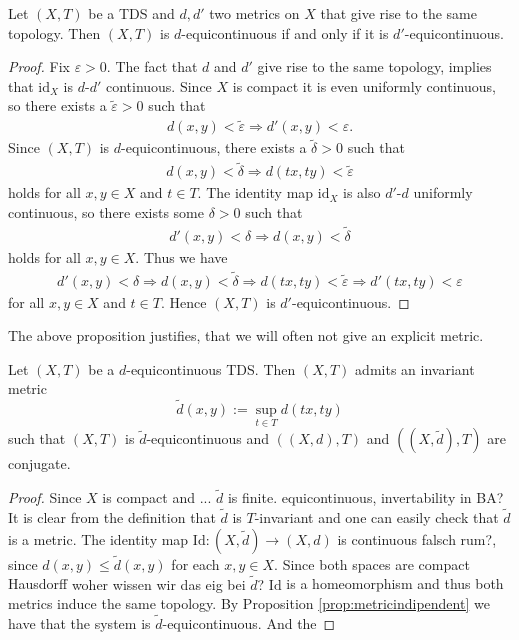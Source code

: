 \begin{proposition}
	Let $(X, T)$ be a TDS and $d, d'$ two metrics on $X$ that give rise to the same topology. Then $(X, T)$ is $d$-equicontinuous if and only if it is $d'$-equicontinuous.
	\label{prop:metricindipendent}
\end{proposition}
\begin{proof}
	Fix $\varepsilon > 0$. The fact that $d$ and $d'$ give rise to the same topology, implies that $\mathrm{id}_X$ is $d$-$d'$ continuous. Since $X$ is compact it is even uniformly continuous, so there exists a $\tilde{\varepsilon} > 0$ such that
	\begin{align*}
		d(x, y) < \tilde{\varepsilon} \Rightarrow d'(x, y) < \varepsilon.
	\end{align*}
	Since $(X, T)$ is $d$-equicontinuous, there exists a $\tilde{\delta} > 0$ such that
	\begin{align*}
		d(x, y) < \tilde{\delta} \Rightarrow d(tx, ty) < \tilde{\varepsilon}
	\end{align*}
	holds for all $x, y \in X$ and $t \in T$. The identity map $\mathrm{id}_X$ is also $d'$-$d$ uniformly continuous, so there exists some $\delta > 0$ such that
	\begin{align*}
		d'(x, y) < \delta \Rightarrow d(x, y) < \tilde{\delta}
	\end{align*}
	holds for all $x, y \in X$. Thus we have
	\begin{align*}
		d'(x, y) < \delta \Rightarrow d(x, y) < \tilde{\delta} \Rightarrow d(tx, ty) < \tilde{\varepsilon} \Rightarrow d'(tx, ty) < \varepsilon
	\end{align*}
	for all $x, y \in X$ and $t \in T$. Hence $(X, T)$ is $d'$-equicontinuous.
\end{proof}

\begin{remark}
	The above proposition justifies, that we will often not give an explicit metric.
\end{remark}

\begin{corollary}
	Let $(X, T)$ be a $d$-equicontinuous TDS.
	Then $(X, T)$ admits an invariant metric
	\[ \tilde{d}(x, y) := \sup_{t \in T} d(tx, ty) \]	
	such that $(X, T)$ is $\tilde{d}$-equicontinuous
	and $((X, d), T)$ and $((X, \tilde{d}), T)$ are conjugate.
\end{corollary}

\begin{proof}
	Since $X$ is compact and ... $\tilde{d}$ is finite. {\color{red} equicontinuous, invertability in BA?}
	It is clear from the definition that $\tilde{d}$ is $T$-invariant
	and one can easily check that $\tilde{d}$ is a metric.
	The identity map $\text{Id} : (X, \tilde{d}) \to (X, d)$ is continuous {\color{red} falsch rum?},
	since $d(x, y) \leq \tilde{d}(x, y)$ for each $x, y \in X$.
	Since both spaces are compact Hausdorff {\color{red} woher wissen wir das eig bei $\tilde{d}$?}
	$\text{Id}$ is a homeomorphism and thus both metrics induce the same topology.
	By Proposition \ref{prop:metricindipendent} we have that the system is $\tilde{d}$-equicontinuous.
	And the 
\end{proof}

